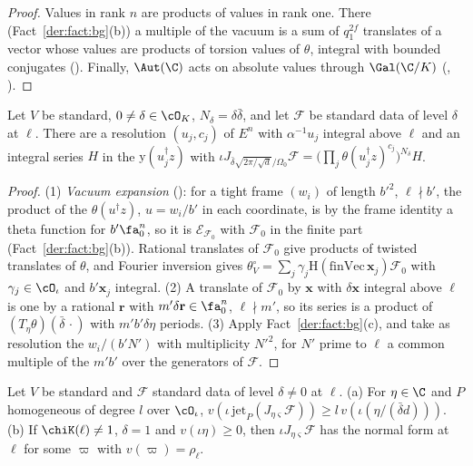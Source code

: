 \begin{proof}
Values in rank $n$ are products of values in rank one. There (Fact~\ref{der:fact:bg}(b)) a
multiple of the vacuum is a sum of $q_1^{2f}$ translates of a vector whose values are products of
torsion values of $\theta$, integral with bounded conjugates
(). Finally, $\Aut(\C)$ acts on absolute
values through $\Gal(\C/K)$ (,
).
\end{proof}

\begin{proposition}\label{der:prop:product}
Let $V$ be standard, $0\ne\delta\in\cO_K$, $N_\delta=\delta\bar\delta$, and let $\mathcal F$ be
standard data of level $\delta$ at $\ell$. There are a resolution $(u_j,c_j)$ of $E^n$ with
$\alpha^{-1}u_j$ integral above $\ell$ and an integral series $H$ in the $\mathrm y(u_j^\dagger z)$
with $\iota J_{\bar\delta\sqrt{2\pi/\sqrt d}/\Omega_0}\mathcal F=\bigl(\prod_j\theta(u_j^\dagger
z)^{c_j}\bigr)^{N_\delta}H$.
\end{proposition}

\begin{proof}
(1) \emph{Vacuum expansion} (): for a tight frame
$(w_i)$ of length $b'^2$, $\ell\nmid b'$, the product of the $\theta(u^\dagger z)$, $u=w_i/b'$ in
each coordinate, is by the frame identity a theta function for $b'\fa_0^n$, so it is
$\mathcal E_{\mathcal F_0}$ with $\mathcal F_0$ in the finite part (Fact~\ref{der:fact:bg}(b)).
Rational translates of $\mathcal F_0$ give products of twisted translates of $\theta$, and Fourier
inversion gives $\theta^\circ_V=\sum_j\gamma_j\mathrm H(\mathrm{finVec}\,\mathbf x_j)\mathcal F_0$ with
$\gamma_j\in\cO_\iota$ and $b'\mathbf x_j$ integral. (2) A translate of $\mathcal F_0$ by $\mathbf x$
with $\delta\mathbf x$ integral above $\ell$ is one by a rational $\mathbf r$ with
$m'\delta\mathbf r\in\fa_0^n$, $\ell\nmid m'$, so its series is a product of
$(T_\eta\theta)(\bar\delta\,\cdot)$ with $m'b'\delta\eta$ periods. (3) Apply
Fact~\ref{der:fact:bg}(c), and take as resolution the $w_i/(b'N')$ with multiplicity ${N'}^2$, for
$N'$ prime to $\ell$ a common multiple of the $m'b'$ over the generators of $\mathcal F$.
\end{proof}

\begin{corollary}
\label{der:cor:integral}
Let $V$ be standard and $\mathcal F$ standard data of level $\delta\ne0$ at $\ell$. (a) For
$\eta\in\C$ and $P$ homogeneous of degree $l$ over $\cO_\iota$,
$v(\iota\,\mathrm{jet}_P(J_{\eta\varsigma}\mathcal F))\ge l\,v(\iota(\eta/(\bar\delta d)))$. (b) If
$\chiK(\ell)\ne1$, $\delta=1$ and $v(\iota\eta)\ge0$, then $\iota J_{\eta\varsigma}\mathcal F$ has the
normal form at $\ell$ for some $\varpi$ with $v(\varpi)=\rho_\ell$.
\end{corollary}


